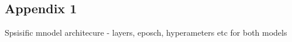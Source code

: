 \subsection{Appendix 1}
Spsisific mnodel architecure - layers, eposch, hyperameters etc for both models
